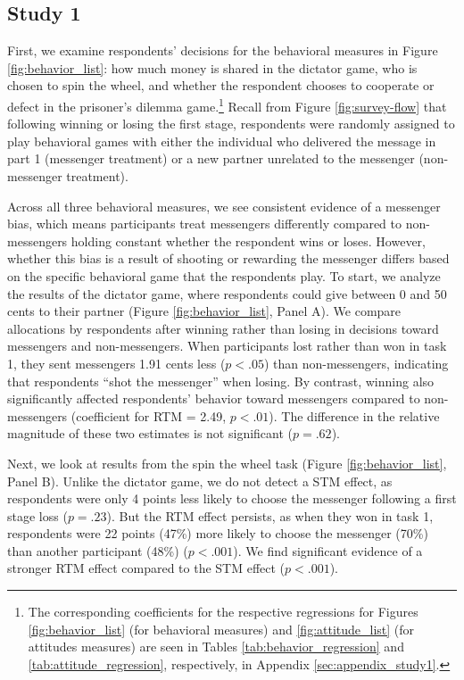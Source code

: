 \subsection{Study 1}

First, we examine respondents' decisions for the behavioral measures in Figure \ref{fig:behavior_list}: how
much money is shared in the dictator game, who is chosen to spin the
wheel, and whether the respondent chooses to cooperate or defect in the
prisoner's dilemma game.\footnote{The corresponding coefficients for
 the respective regressions for Figures \ref{fig:behavior_list} (for behavioral measures) and \ref{fig:attitude_list} (for attitudes measures) are seen in Tables \ref{tab:behavior_regression} and \ref{tab:attitude_regression}, respectively, in
 Appendix \ref{sec:appendix_study1}.} Recall from Figure \ref{fig:survey-flow} that following winning or
losing the first stage, respondents were randomly assigned to play
behavioral games with either the individual who delivered the message in
part 1 (messenger treatment) or a new partner unrelated to the messenger
(non-messenger treatment).



Across all three behavioral measures, we see consistent evidence of a
messenger bias, which means participants treat messengers differently
compared to non-messengers holding constant whether the respondent wins or
loses. However, whether this bias is a result of shooting or rewarding
the messenger differs based on the specific behavioral game that the
respondents play. To start, we analyze the results of the dictator game,
where respondents could give between 0 and 50 cents to their partner
(Figure \ref{fig:behavior_list}, Panel A). We compare allocations by respondents after
winning rather than losing in decisions toward messengers and
non-messengers. When participants lost rather than won in task 1, they
sent messengers 1.91 cents less ($p < .05$) than
non-messengers, indicating that respondents ``shot the messenger''
when losing. By contrast, winning also significantly affected respondents'
behavior toward messengers compared to non-messengers (coefficient for
RTM = 2.49, $p < .01$). The difference in the relative
magnitude of these two estimates is not significant ($p =
.62$).

Next, we look at results from the spin the wheel task (Figure \ref{fig:behavior_list}, Panel B). Unlike the dictator game, we do not detect a STM effect, as 
respondents were only 4 points less likely to choose the messenger following
a first stage loss ($p = .23$). But the RTM effect persists, as when
they won in task 1, respondents were 22 points (47\%) more likely to
choose the messenger (70\%) than another participant
(48\%) ($p < .001$). We find significant
evidence of a stronger RTM effect compared to the STM effect ($p < .001$).

